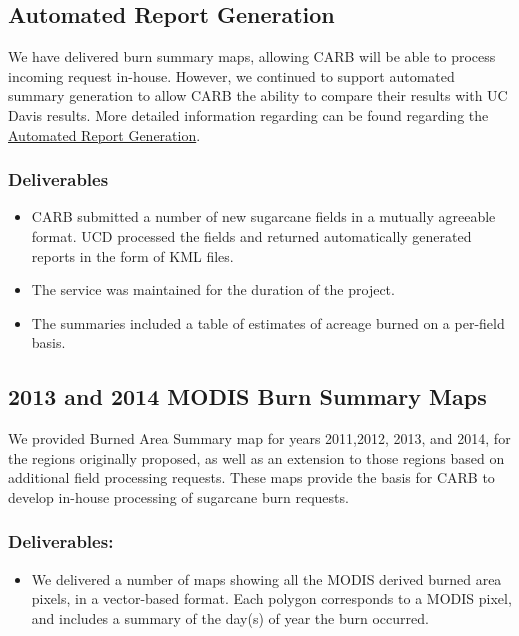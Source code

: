 \documentclass[]{article}
\begin{document}
\subsection{Automated Report
Generation}\label{automated-report-generation}

We have delivered burn summary maps, allowing CARB will be able to
process incoming request in-house. However, we continued to support
automated summary generation to allow CARB the ability to compare their
results with UC Davis results. More detailed information regarding can
be found regarding the
\href{Automated\%20Report\%20Generation}{Automated Report Generation}.

\subsubsection{Deliverables}\label{deliverables}

\begin{itemize}
\itemsep1pt\parskip0pt
\item
  CARB submitted a number of new sugarcane fields in a mutually
  agreeable format. UCD processed the fields and returned automatically
  generated reports in the form of KML files.
\item
  The service was maintained for the duration of the project.
\item
  The summaries included a table of estimates of acreage burned on a
  per-field basis.
\end{itemize}

\subsection{2013 and 2014 MODIS Burn Summary
Maps}\label{and-2014-modis-burn-summary-maps}

We provided Burned Area Summary map for years 2011,2012, 2013, and 2014,
for the regions originally proposed, as well as an extension to those
regions based on additional field processing requests. These maps
provide the basis for CARB to develop in-house processing of sugarcane
burn requests.

\subsubsection{Deliverables:}\label{deliverables-1}

\begin{itemize}
\itemsep1pt\parskip0pt
\item
  We delivered a number of maps showing all the MODIS derived burned
  area pixels, in a vector-based format. Each polygon corresponds to a
  MODIS pixel, and includes a summary of the day(s) of year the burn
  occurred.
\end{itemize}
\end{document}
